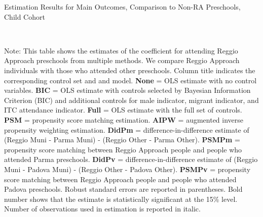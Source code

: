 \begin{table}[H] \caption{Estimation Results for Main Outcomes, Comparison to Non-RA Preschools, Child Cohort} \label{ols-M-child-reg-pres}
\scalebox{0.7}{}
\vspace{1ex} \\
\footnotesize\raggedright{Note: This table shows the estimates of the coefficient for attending Reggio Approach preschools from multiple methods. We compare Reggio Approach individuals with those who attended other preschools. Column title indicates the corresponding control set and and model. \textbf{None} = OLS estimate with no control variables. \textbf{BIC} = OLS estimate with controls selected by Bayesian Information Criterion (BIC) and additional controls for male indicator, migrant indicator, and ITC attendance indicator. \textbf{Full} = OLS estimate with the full set of controls. \textbf{PSM} =  propensity score matching estimation. \textbf{AIPW} = augmented inverse propensity weighting estimation. \textbf{DidPm} = difference-in-difference estimate of (Reggio Muni - Parma Muni) - (Reggio Other - Parma Other). \textbf{PSMPm} = propensity score matching between Reggio Approach people and people who attended Parma preschools. \textbf{DidPv} = difference-in-difference estimate of (Reggio Muni - Padova Muni) - (Reggio Other - Padova Other). \textbf{PSMPv} = propensity score matching between Reggio Approach people and people who attended Padova preschools. Robust standard errors are reported in parentheses. Bold number shows that the estimate is statistically significant at the 15\% level. Number of observations used in estimation is reported in italic.}

\end{table}


